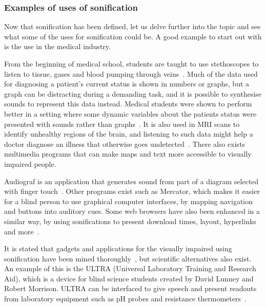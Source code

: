 

\subsubsection{Examples of uses of sonification} %
\label{ssub:examples_of_sonification}

Now that sonification has been defined, let us delve further into the topic and see what some of the uses for sonification could be. 
A good example to start out with is the use in the medical industry. 

From the beginning of medical school, students are taught to use stethoscopes to listen to tissue, gases and blood pumping through veins~\cite[Ch. 1]{Barrass1999}. 
Much of the data used for diagnosing a patient’s current status is shown in numbers or graphs, but a graph can be distracting during a demanding task, and it is possible to synthesise sounds to represent this data instead.
Medical students were shown to perform better in a setting where some dynamic variables about the patients status were presented with sounds rather than graphs~\cite[Ch. 1]{Barrass1999}. 
It is also used in MRI scans to identify unhealthy regions of the brain, and listening to such data might help a doctor diagnose an illness that otherwise goes undetected~\cite[Ch. 1]{Barrass1999}. 
There also exists multimedia programs that can make maps and text more accessible to visually impaired people.

Audiograf is an application that generates sound from part of a diagram selected with finger touch~\cite[Ch. 2]{Barrass1999}. 
Other programs exist such as Mercator, which makes it easier for a blind person to use graphical computer interfaces, by mapping navigation and buttons into auditory cues. 
Some web browsers have also been enhanced in a similar way, by using sonifications to present download times, layout, hyperlinks and more~\cite[Ch. 2]{Barrass1999}.

It is stated that gadgets and applications for the visually impaired using sonification have been mined thoroughly~\cite{Girvan2005}, but scientific alternatives also exist. 
An example of this is the ULTRA (Universal Laboratory Training and Research Aid), which is a device for blind science students created by David Lunney and Robert Morrison. 
ULTRA can be interfaced to give speech and present readouts from laboratory equipment such as pH probes and resistance thermometers~\cite{Girvan2005}.

